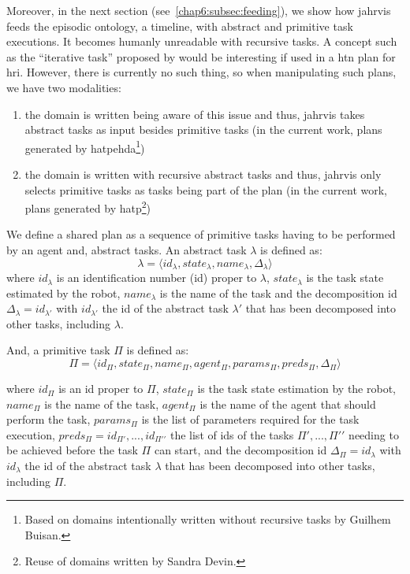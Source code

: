 \documentclass[a4paper,11pt,twoside]{StyleThese}
\begin{document}
Moreover, in the next section (see~\ref{chap6:subsec:feeding}), we show how \acrshort{jahrvis} feeds the episodic ontology, a timeline, with abstract and primitive task executions. It becomes humanly unreadable with recursive tasks. A concept such as the ``iterative task'' proposed by \cite{martinie_2011_structuring} would be interesting if used in a \acrshort{htn} plan for \acrshort{hri}. However, there is currently no such thing, so when manipulating such plans, we have two modalities:
\begin{enumerate}
	\item the domain is written being aware of this issue and thus, \acrshort{jahrvis} takes abstract tasks as input besides primitive tasks (\ie in the current work, plans generated by \acrshort{hatpehda}\footnote{Based on domains intentionally written without recursive tasks by Guilhem Buisan.})
	\item the domain is written with recursive abstract tasks and thus, \acrshort{jahrvis} only selects primitive tasks as tasks being part of the plan (\ie in the current work, plans generated by \acrshort{hatp}\footnote{Reuse of domains written by Sandra Devin.})
\end{enumerate}

We define a shared plan as a sequence of primitive tasks having to be performed by an agent and, abstract tasks. An abstract task $\lambda$ is defined as: 
\[\lambda=\langle id_\lambda,state_\lambda,name_\lambda,\Delta_\lambda\rangle\] 
where $id_\lambda$ is an identification number (id) proper to $\lambda$, $state_\lambda$ is the task state estimated by the robot, $name_\lambda$ is the name of the task and the decomposition id $\Delta_\lambda=id_{\lambda\prime}$ with $id_{\lambda\prime}$ the id of the abstract task $\lambda\prime$ that has been decomposed into other tasks, including $\lambda$.

And, a primitive task $\Pi$ is defined as:
\[\Pi=\langle id_\Pi,state_\Pi,name_\Pi,agent_\Pi,params_\Pi,preds_\Pi,\Delta_\Pi\rangle\]

where $id_\Pi$ is an id proper to $\Pi$, $state_\Pi$ is the task state estimation by the robot, $name_\Pi$ is the name of the task, $agent_\Pi$ is the name of the agent that should perform the task, $params_\Pi$ is the list of parameters required for the task execution, $preds_\Pi={id_{\Pi\prime},...,id_{\Pi\prime\prime}}$ the list of ids of the tasks $\Pi\prime,...,\Pi\prime\prime$ needing to be achieved before the task $\Pi$ can start, and the decomposition id $\Delta_\Pi=id_{\lambda}$ with $id_{\lambda}$ the id of the abstract task $\lambda$ that has been decomposed into other tasks, including $\Pi$.
\end{document}
